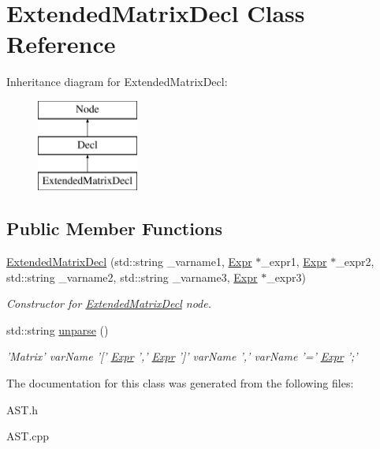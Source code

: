\hypertarget{classExtendedMatrixDecl}{\section{Extended\-Matrix\-Decl Class Reference}
\label{classExtendedMatrixDecl}
}
Inheritance diagram for Extended\-Matrix\-Decl\-:\begin{figure}[H]
\begin{center}
\leavevmode
\includegraphics[height=3.000000cm]{classExtendedMatrixDecl}
\end{center}
\end{figure}
\subsection*{Public Member Functions}
\begin{DoxyCompactItemize}
\item 
\hypertarget{classExtendedMatrixDecl_a6f62ebcd1a88e224ab02ac7175c99d45}{\hyperlink{classExtendedMatrixDecl_a6f62ebcd1a88e224ab02ac7175c99d45}{Extended\-Matrix\-Decl} (std\-::string \-\_\-varname1, \hyperlink{classExpr}{Expr} $\ast$\-\_\-expr1, \hyperlink{classExpr}{Expr} $\ast$\-\_\-expr2, std\-::string \-\_\-varname2, std\-::string \-\_\-varname3, \hyperlink{classExpr}{Expr} $\ast$\-\_\-expr3)}\label{classExtendedMatrixDecl_a6f62ebcd1a88e224ab02ac7175c99d45}

\begin{DoxyCompactList}\small\item\em Constructor for \hyperlink{classExtendedMatrixDecl}{Extended\-Matrix\-Decl} node. \end{DoxyCompactList}\item 
\hypertarget{classExtendedMatrixDecl_ae748f367ce4f92b68a11f504e98bf97f}{std\-::string \hyperlink{classExtendedMatrixDecl_ae748f367ce4f92b68a11f504e98bf97f}{unparse} ()}\label{classExtendedMatrixDecl_ae748f367ce4f92b68a11f504e98bf97f}

\begin{DoxyCompactList}\small\item\em 'Matrix' var\-Name '\mbox{[}' \hyperlink{classExpr}{Expr} ',' \hyperlink{classExpr}{Expr} '\mbox{]}' var\-Name ',' var\-Name '=' \hyperlink{classExpr}{Expr} ';' \end{DoxyCompactList}\end{DoxyCompactItemize}


The documentation for this class was generated from the following files\-:\begin{DoxyCompactItemize}
\item 
A\-S\-T.\-h\item 
A\-S\-T.\-cpp\end{DoxyCompactItemize}
